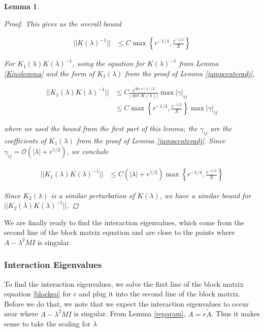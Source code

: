 \documentclass[12pt]{article}
\newtheorem{lemma}{Lemma}
\begin{document}
\begin{lemma}
\begin{proof}
This gives us the overall bound

\begin{align*}
||K(\lambda)^{-1}|| &\leq C \max \left\{ r^{-1/4}, \frac{r^{-1/2}}{X} \right\}
\end{align*}

For $K_1(\lambda)K(\lambda)^{-1}$, using the equation for $K(\lambda)^{-1}$ from Lemma \ref{Kinvlemma} and the form of $K_1(\lambda)$ from the proof of Lemma \ref{jumpcenteradj},

\begin{align*}
||K_1(\lambda)K(\lambda)^{-1}|| &\leq 
C \frac{e^{|\text{Re }\nu(\lambda)|X}}{|\det K(\lambda)|} \max {|\gamma|_{ij}} \\
&\leq C \max \left\{ r^{-1/4}, \frac{r^{-1/2}}{X} \right\} \max {|\gamma|_{ij}}
\end{align*}

where we used the bound from the first part of this lemma; the $\gamma_{ij}$ are the coefficients of $K_1(\lambda)$ from the proof of Lemma \ref{jumpcenteradj}. Since $\gamma_{ij} = \mathcal{O}(|\lambda| + r^{\tilde{\gamma}/2})$, we conclude

\begin{align*}
||K_1(\lambda)K(\lambda)^{-1}|| &\leq C (|\lambda| + r^{\tilde{\gamma}/2}) \max \left\{ r^{-1/4}, \frac{r^{-1/2}}{X} \right\}
\end{align*}

Since $K_2(\lambda)$ is a similar perturbation of $K(\lambda)$, we have a similar bound for $||K_2(\lambda)K(\lambda)^{-1}||$.
\end{proof}
\end{lemma}

We are finally ready to find the interaction eigenvalues, which come from the second line of the block matrix equation and are close to the points where $A - \lambda^2 M I$ is singular.

\subsubsection{Interaction Eigenvalues}

To find the interaction eigenvalues, we solve the first line of the block matrix equation \eqref{blockeq} for $c$ and plug it into the second line of the block matrix. Before we do that, we note that we expect the interaction eigenvalues to occur near where $A - \lambda^2 M I$ is singular. From Lemma \ref{reparam}, $A = r \tilde{A}$. Thus it makes sense to take the scaling for $\lambda$
\end{document}
